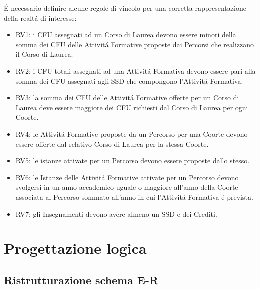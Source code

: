 \documentclass[a4paper,12pt,italian,towside]{article}
\begin{document}
\'E necessario definire alcune regole di vincolo per una corretta rappresentazione della realt\'a di interesse:
\begin{itemize}
	\item RV1: i CFU assegnati ad un Corso di Laurea devono essere minori della somma dei CFU delle Attivit\'a Formative proposte dai Percorsi che realizzano il Corso di Laurea.
	\item RV2: i CFU totali assegnati ad una Attivit\'a Formativa devono essere pari alla somma dei CFU assegnati agli SSD che compongono l'Attivit\'a Formativa.
	\item RV3: la somma dei CFU delle Attivit\'a Formative offerte per un Corso di Laurea deve essere maggiore dei CFU richiesti dal Corso di Laurea per ogni Coorte.
	\item RV4: le Attivit\'a Formative proposte da un Percorso per una Coorte devono essere offerte dal relativo Corso di Laurea per la stessa Coorte.
	\item RV5: le istanze attivate per un Percorso devono essere proposte dallo stesso. 
	\item RV6: le Istanze delle Attivit\'a Formative attivate per un Percorso devono svolgersi in un anno accademico uguale o maggiore all'anno della Coorte associata al Percorso sommato all'anno in cui l'Attivit\'a Formativa \'e prevista.
	\item RV7: gli Insegnamenti devono avere almeno un SSD e dei Crediti.
\end{itemize}

\newpage
\section{Progettazione logica}

\subsection{Ristrutturazione schema E-R}
\end{document}
